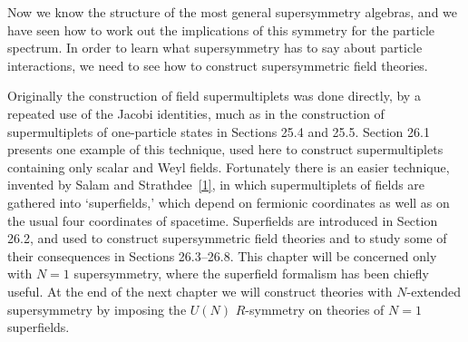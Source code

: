 
Now we know the structure of the most general supersymmetry algebras, and we
have seen how to work out the implications of this symmetry for the particle
spectrum. In order to learn what supersymmetry has to say about particle
interactions, we need to see how to construct supersymmetric field theories.

Originally the construction of field supermultiplets was done directly, by a
repeated use of the Jacobi identities, much as in the construction of
supermultiplets of one-particle states in Sections 25.4 and 25.5. Section 26.1
presents one example of this technique, used here to construct supermultiplets
containing only scalar and Weyl fields. Fortunately there is an easier
technique, invented by Salam and Strathdee~\hyperref[ch26-ref-1]{[1]}, in which
supermultiplets of fields are gathered into `superfields,' which depend on
fermionic coordinates as well as on the usual four coordinates of spacetime.
Superfields are introduced in Section 26.2, and used to construct
supersymmetric field theories and to study some of their consequences in
Sections 26.3--26.8. This chapter will be concerned only with \(N=1\)
supersymmetry, where the superfield formalism has been chiefly useful. At the
end of the next chapter we will construct theories with \(N\)-extended
supersymmetry by imposing the \(U(N)\) \(R\)-symmetry on theories of \(N=1\)
superfields.
